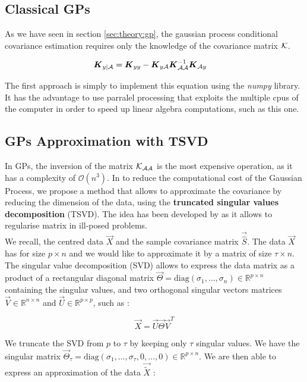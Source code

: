 \subsection{Classical GPs}

As we have seen in section \ref{sec:theory:gp}, the gaussian process conditional covariance estimation requires only the knowledge of the covariance matrix $\mathcal{K}$. 

\begin{align}
	{\boldsymbol{{K}}}_{y | \mathcal{A}} &=  {\boldsymbol{{K}}}_{yy} - {\boldsymbol{{K}}}_{y\mathcal{A}} {\boldsymbol{{K}}}_{\mathcal{A}\mathcal{A}}^{-1} {\boldsymbol{{K}}}_{\mathcal{A} y} 
\end{align}

The first approach is simply to implement this equation using the \textit{numpy} library. It has the advantage to use parralel processing that exploits the multiple cpus of the computer in order to speed up linear algebra computations, such as this one. 

\subsection{GPs Approximation with TSVD}

In GPs, the inversion of the matrix $\mathcal{K}_{\mathcal{A}\mathcal{A}}$ is the most expensive operation, as it has a complexity of $\mathcal{O}(n^3)$. In to reduce the computational cost of the Gaussian Process, we propose a method that allows to approximate the covariance by reducing the dimension of the data, using the \textbf{truncated singular values decomposition} (TSVD). The idea has been developed by \citep{hansen_truncatedsvd_1987} as it allows to regularise matrix in ill-posed problems.  \\

We recall, the centred data $\vec{X}$ and the sample covariance matrix $\vec{\hat{S}}$. The data $\vec{X}$ has for size $p\times n$ and we would like to approximate it by a matrix of size $\tau \times n $. The singular value decomposition (SVD) allows to express the data matrix as a product of a rectangular diagonal matrix $\vec{\Theta} = \text{diag}(\sigma_1, \dots, \sigma_n ) \in \mathbb{R}^{p \times n} $ containing the singular values, and two orthogonal singular vectors matrices $\vec{V} \in \mathbb{R}^{n \times n} $ and $\vec{U} \in \mathbb{R}^{p \times p} $, such as : 

\begin{equation}
	\vec{X} = \vec{U} \vec{\Theta} \vec{V}^T
\end{equation}

We truncate the SVD from $p$ to $\tau$ by keeping only $\tau$ singular values. We have the singular matrix $\vec{\Theta}_\tau = \text{diag}(\sigma_1, \dots, \sigma_\tau, 0, \dots, 0 ) \in \mathbb{R}^{p \times n} $. We are then able to express an approximation of the data $\vec{\tilde{X}}$ : 

